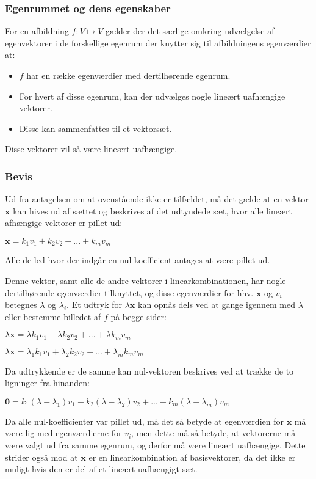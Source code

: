 \documentclass{article}
\newcommand{\cent}[1]{\begin{center}#1\end{center}}
\begin{document}
	\subsubsection{Egenrummet og dens egenskaber}
	For en afbildning $f : V \mapsto V$ gælder der det særlige omkring udvælgelse af egenvektorer i de forskellige egenrum der knytter sig til afbildningens egenværdier at:
	\begin{itemize}
		\item $f$ har en række egenværdier med dertilhørende egenrum.
		\item For hvert af disse egenrum, kan der udvælges nogle lineært uafhængige vektorer.
		\item Disse kan sammenfattes til et vektorsæt.
	\end{itemize}
	Disse vektorer vil så være lineært uafhængige.
	\subsubsection*{Bevis}
	
	Ud fra antagelsen om at ovenstående ikke er tilfældet, må det gælde at en vektor $ \textbf{x} $ kan hives ud af sættet og beskrives af det udtyndede sæt, hvor alle lineært afhængige vektorer er pillet ud: 
	
	\cent{$ \textbf{x} = k_1v_1+k_2v_2+...+k_mv_m $}
	
	Alle de led hvor der indgår en nul-koefficient antages at være pillet ud. \newline
	
	Denne vektor, samt alle de andre vektorer i linearkombinationen, har nogle dertilhørende egenværdier tilknyttet, og disse  egenværdier for hhv. $\textbf{x}$ og $v_i$ betegnes $\lambda$ og $\lambda_i$. Et udtryk for $\lambda\textbf{x}$ kan opnås dels ved at gange igennem med $\lambda$ eller bestemme billedet af $f$ på begge sider:
	
	\cent{$\lambda\textbf{x} = \lambda k_1 v_1+\lambda k_2 v_2+...+\lambda k_m v_m $}
	\cent{$\lambda\textbf{x} = \lambda_1 k_1 v_1+\lambda_2 k_2 v_2+...+\lambda_m k_m v_m $}
	
	Da udtrykkende er de samme kan nul-vektoren beskrives ved at trække de to ligninger fra hinanden:
	
	\cent{ $ \textbf{0} = k_1(\lambda - \lambda_1)v_1 + k_2(\lambda - \lambda_2)v_2 + ... + k_m(\lambda - \lambda_m)v_m $ }
	
	Da alle nul-koefficienter var pillet ud, må det så betyde at egenværdien for $ \textbf{x} $ må være lig med egenværdierne for $v_i$, men dette må så betyde, at vektorerne må være valgt ud fra samme egenrum, og derfor må være lineært uafhængige. Dette strider også mod at $\textbf{x}$ er en linearkombination af basisvektorer, da det ikke er muligt hvis den er del af et lineært uafhængigt sæt. \newline
	
\end{document}
